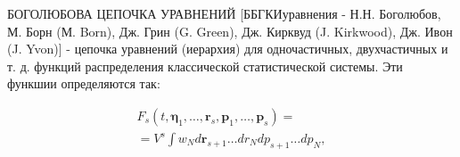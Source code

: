 \documentclass[10pt]{article}
\begin{document}
БОГОЛЮБОВА ЦЕПОЧКА УРАВНЕНИЙ [ББГКИуравнения - Н.Н. Боголюбов, М. Борн (М. Born), Дж. Грин (G. Green), Дж. Кирквуд (J. Kirkwood), Дж. Ивон (J. Yvon)] - цепочка уравнений (иерархия) для одночастичных, двухчастичных и т. д. функций распределения классической статистической системы. Эти функшии определяются так:



\[

\begin{gathered}

F_{s}\left(t, \boldsymbol{\eta}_{1}, \ldots, \boldsymbol{r}_{s}, \boldsymbol{p}_{1}, \ldots, \boldsymbol{p}_{s}\right)= \\

=V^{s} \int w_{N} d \boldsymbol{r}_{s+1} \ldots d r_{N} d p_{s+1} \ldots d p_{N},

\end{gathered}

\]
\end{document}
